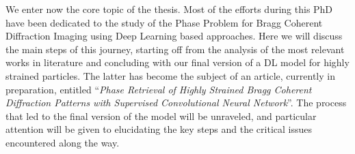 

We enter now the core topic of the thesis. Most of the efforts during this PhD have been dedicated to the study of the Phase Problem 
for Bragg Coherent Diffraction Imaging using Deep Learning based approaches. Here we will discuss the main steps of this
journey, starting off from the analysis of the most relevant works in literature and concluding with our final version
of a DL model for highly strained particles. The latter has become the subject of an article, currently in preparation, 
entitled ``\textit{Phase Retrieval of Highly Strained Bragg Coherent Diffraction Patterns with Supervised Convolutional 
Neural Network}''. The process that led to the final version of the model will be unraveled, and particular attention
 will be given to elucidating the key steps and the critical issues encountered along the way. 

